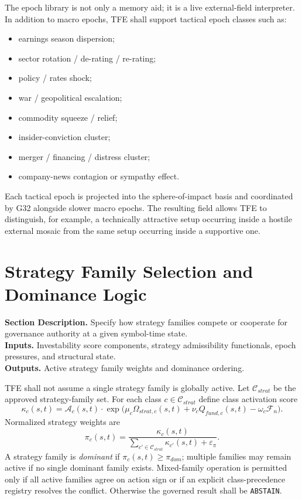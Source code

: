\documentclass[11pt]{report}
\newcommand{\meta}[3]{\textbf{Section Description.} #1\\
\textbf{Inputs.} #2\\
\textbf{Outputs.} #3\par}
\begin{document}
The epoch library is not only a memory aid; it is a live external-field interpreter. In addition to macro epochs, TFE shall support tactical epoch classes such as:
\begin{itemize}
    \item earnings season dispersion;
    \item sector rotation / de-rating / re-rating;
    \item policy / rates shock;
    \item war / geopolitical escalation;
    \item commodity squeeze / relief;
    \item insider-conviction cluster;
    \item merger / financing / distress cluster;
    \item company-news contagion or sympathy effect.
\end{itemize}
Each tactical epoch is projected into the sphere-of-impact basis and coordinated by G32 alongside slower macro epochs. The resulting field allows TFE to distinguish, for example, a technically attractive setup occurring inside a hostile external mosaic from the same setup occurring inside a supportive one.


\section{Strategy Family Selection and Dominance Logic}
\meta{Specify how strategy families compete or cooperate for governance authority at a given symbol-time state.}{Investability score components, strategy admissibility functionals, epoch pressures, and structural state.}{Active strategy family weights and dominance ordering.}

TFE shall not assume a single strategy family is globally active. Let $\mathcal{C}_{strat}$ be the approved strategy-family set. For each class $c\in\mathcal{C}_{strat}$ define class activation score
\[
\kappa_c(s,t)=\mathcal{A}_c(s,t)\cdot \exp\big(\mu_c\Omega_{strat,c}(s,t)+\nu_c Q_{fund,c}(s,t)-\omega_c\mathcal{F}_n\big).
\]
Normalized strategy weights are
\[
\pi_c(s,t)=\frac{\kappa_c(s,t)}{\sum_{c'\in\mathcal{C}_{strat}}\kappa_{c'}(s,t)+\varepsilon_{\pi}}.
\]
A strategy family is \emph{dominant} if $\pi_c(s,t)\ge \pi_{dom}$; multiple families may remain active if no single dominant family exists. Mixed-family operation is permitted only if all active families agree on action sign or if an explicit class-precedence registry resolves the conflict. Otherwise the governed result shall be \texttt{ABSTAIN}.
\end{document}
